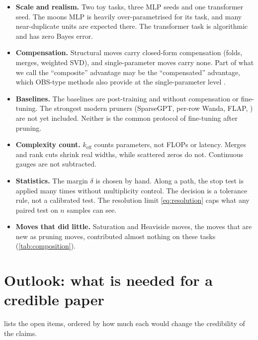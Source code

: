 \documentclass[11pt,a4paper]{article}
\theoremstyle{definition}
\newcommand{\keff}{k_{\mathrm{eff}}}
\begin{document}
\begin{itemize}
\item \textbf{Scale and realism.} Two toy tasks, three MLP seeds and one transformer
seed. The moons MLP is heavily over-parametrised for its task, and many near-duplicate
units are expected there. The transformer task is algorithmic and has zero Bayes error.
\item \textbf{Compensation.} Structural moves carry closed-form compensation (folds,
merges, weighted SVD), and single-parameter moves carry none. Part of what we call the
``composite'' advantage may be the ``compensated'' advantage, which OBS-type methods
also provide at the single-parameter level
\citep{hassibi1993obs,frantar2023sparsegpt}.
\item \textbf{Baselines.} The baselines are post-training and without compensation or
fine-tuning. The strongest modern pruners (SparseGPT, per-row Wanda, FLAP,
\citealp{kwon2022fast}) are not yet included. Neither is the common protocol of
fine-tuning after pruning.
\item \textbf{Complexity count.} $\keff$ counts parameters, not FLOPs or latency.
Merges and rank cuts shrink real widths, while scattered zeros do not. Continuous gauges
are not subtracted.
\item \textbf{Statistics.} The margin $\delta$ is chosen by hand. Along a path, the
stop test is applied many times without multiplicity control. The decision is a
tolerance rule, not a calibrated test. The resolution limit \eqref{eq:resolution}
caps what any paired test on $n$ samples can see.
\item \textbf{Moves that did little.} Saturation and Heaviside moves, the moves that are
new as pruning moves, contributed almost nothing on these tasks (\cref{tab:composition}).
\end{itemize}

\section{Outlook: what is needed for a credible paper}
\label{sec:outlook}

 lists the open items, ordered by how much each would change the
credibility of the claims.
\end{document}
